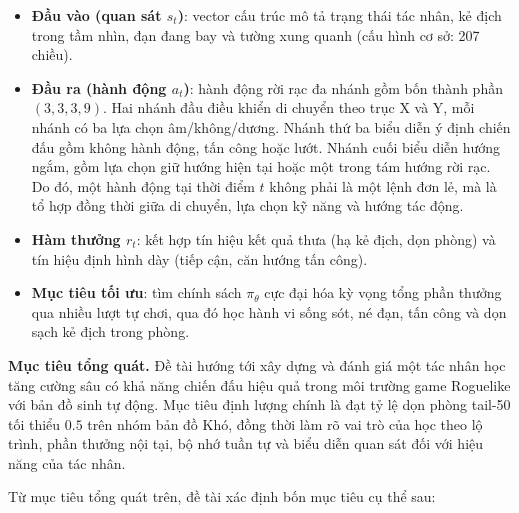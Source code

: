 \begin{itemize}
    \item \textbf{Đầu vào (quan sát $s_t$)}: vector cấu trúc mô tả trạng thái tác nhân, kẻ địch trong tầm nhìn, đạn đang bay và tường xung quanh (cấu hình cơ sở: 207 chiều).
    \item \textbf{Đầu ra (hành động $a_t$)}: hành động rời rạc đa nhánh gồm bốn thành phần $(3,3,3,9)$. Hai nhánh đầu điều khiển di chuyển theo trục X và Y, mỗi nhánh có ba lựa chọn âm/không/dương. Nhánh thứ ba biểu diễn ý định chiến đấu gồm không hành động, tấn công hoặc lướt. Nhánh cuối biểu diễn hướng ngắm, gồm lựa chọn giữ hướng hiện tại hoặc một trong tám hướng rời rạc. Do đó, một hành động tại thời điểm $t$ không phải là một lệnh đơn lẻ, mà là tổ hợp đồng thời giữa di chuyển, lựa chọn kỹ năng và hướng tác động.
    \item \textbf{Hàm thưởng $r_t$}: kết hợp tín hiệu kết quả thưa (hạ kẻ địch, dọn phòng) và tín hiệu định hình dày (tiếp cận, căn hướng tấn công).
    \item \textbf{Mục tiêu tối ưu}: tìm chính sách $\pi_\theta$ cực đại hóa kỳ vọng tổng phần thưởng qua nhiều lượt tự chơi, qua đó học hành vi sống sót, né đạn, tấn công và dọn sạch kẻ địch trong phòng.
\end{itemize}

\vspace{0.5cm}

\textbf{Mục tiêu tổng quát.} Đề tài hướng tới xây dựng và đánh giá một tác nhân học tăng cường sâu có khả năng chiến đấu hiệu quả trong môi trường game Roguelike với bản đồ sinh tự động. Mục tiêu định lượng chính là đạt tỷ lệ dọn phòng tail-50 tối thiểu $0.5$ trên nhóm bản đồ Khó, đồng thời làm rõ vai trò của học theo lộ trình, phần thưởng nội tại, bộ nhớ tuần tự và biểu diễn quan sát đối với hiệu năng của tác nhân.

Từ mục tiêu tổng quát trên, đề tài xác định bốn mục tiêu cụ thể sau:

